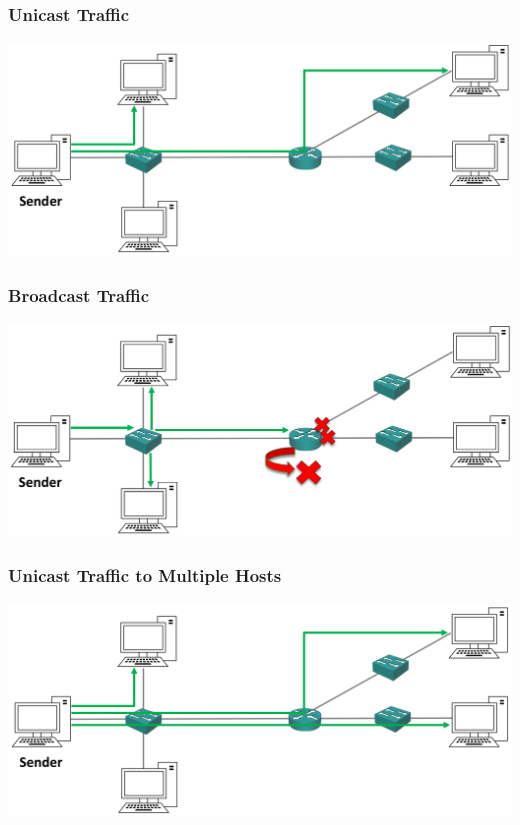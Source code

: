 \documentclass[pdflatex,compress]{beamer}
\begin{document}
\begin{frame}
	\frametitle{Unicast Traffic}
	\begin{center}
		\includegraphics[width=\linewidth]{img/img10}
	\end{center}
\end{frame}

\begin{frame}
	\frametitle{Broadcast Traffic}
	\begin{center}
		\includegraphics[width=\linewidth]{img/img11}
	\end{center}
\end{frame}

\begin{frame}
	\frametitle{Unicast Traffic to Multiple Hosts}
	\begin{center}
		\includegraphics[width=\linewidth]{img/img12}
	\end{center}
\end{frame}
\end{document}
